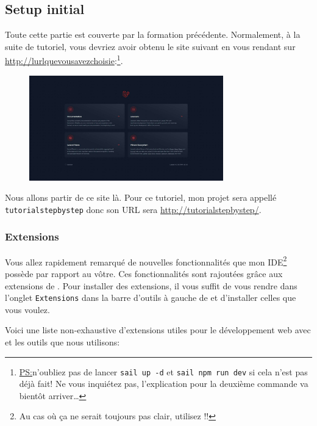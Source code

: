 \subsection{Setup initial}

Toute cette partie est couverte par la formation précédente. Normalement, à la suite de tutoriel, vous devriez avoir obtenu le site suivant en vous rendant sur \url{http://lurlquevousavezchoisie}:\footnote{\underline{PS:}n'oubliez pas de lancer \verb|sail up -d| et \verb|sail npm run dev| si cela n'est pas déjà fait! Ne vous inquiétez pas, l'explication pour la deuxième commande va bientôt arriver\ldots}.

\begin{figure}[!h]
    \centering
    \includegraphics[width=0.75\textwidth]{figures-C1/laravel_default_website.pdf}
\end{figure}

Nous allons partir de ce site là. Pour ce tutoriel, mon projet sera appellé \texttt{tutorialstepbystep} donc son URL sera \url{http://tutorialstepbystep/}.

\newpage
\subsubsection[Extensions]{Extensions}

Vous allez rapidement remarqué de nouvelles fonctionnalités que mon IDE\footnote{Au cas où ça ne serait toujours pas clair, utilisez \vscode{} !!} possède par rapport au vôtre. Ces fonctionnalités sont rajoutées grâce aux extensions de \vscode{}. Pour installer des extensions, il vous suffit de vous rendre dans l'onglet \verb|Extensions| dans la barre d'outils à gauche de \vscode{} et d'installer celles que vous voulez.

Voici une liste non-exhaustive d'extensions utiles pour le développement web avec \laravel{} et les outils que nous utilisons:

